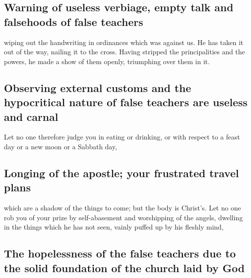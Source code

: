 \hypertarget{warning-of-useless-verbiage-empty-talk-and-falsehoods-of-false-teachers}{%
\subsection{Warning of useless verbiage, empty talk and falsehoods of
false
teachers}\label{warning-of-useless-verbiage-empty-talk-and-falsehoods-of-false-teachers}}

 wiping out the handwriting in ordinances which was
against us. He has taken it out of the way, nailing it to the cross.
 Having stripped the principalities and the powers, he
made a show of them openly, triumphing over them in it.

\hypertarget{observing-external-customs-and-the-hypocritical-nature-of-false-teachers-are-useless-and-carnal}{%
\subsection{Observing external customs and the hypocritical nature of
false teachers are useless and
carnal}\label{observing-external-customs-and-the-hypocritical-nature-of-false-teachers-are-useless-and-carnal}}

 Let no one therefore judge you in eating or drinking, or
with respect to a feast day or a new moon or a Sabbath day,

\hypertarget{longing-of-the-apostle-your-frustrated-travel-plans}{%
\subsection{Longing of the apostle; your frustrated travel
plans}\label{longing-of-the-apostle-your-frustrated-travel-plans}}

 which are a shadow of the things to come; but the body
is Christ's.  Let no one rob you of your prize by
self-abasement and worshipping of the angels, dwelling in the things
which he has not seen, vainly puffed up by his fleshly mind,

\hypertarget{the-hopelessness-of-the-false-teachers-due-to-the-solid-foundation-of-the-church-laid-by-god}{%
\subsection{The hopelessness of the false teachers due to the solid
foundation of the church laid by
God}\label{the-hopelessness-of-the-false-teachers-due-to-the-solid-foundation-of-the-church-laid-by-god}}

